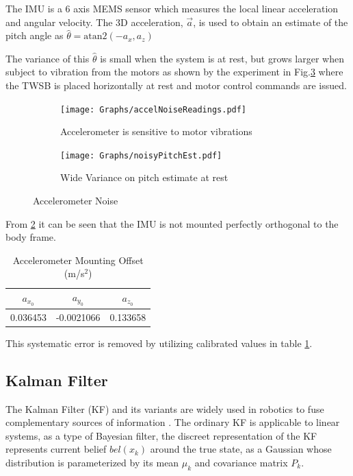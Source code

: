         The IMU is a 6 axis MEMS sensor \cite{ComplimentaryKalman} which measures the local linear acceleration 
        and angular velocity.
        The 3D acceleration, $\vec{a}$, is used to obtain an 
        estimate of the pitch angle as $\hat{\theta} = \mathrm{atan2}\left(-a_x ,a_z \right)$

        The variance of this $\hat{\theta}$ is small when the system is at rest, but grows larger when subject to vibration from the motors
        as shown by the experiment in Fig.\ref{fig:accelNoise} where the TWSB is placed horizontally at rest and motor control commands are issued. 
        \begin{figure}[H]
            \centering
            \begin{subfigure}[b]{0.5\textwidth}

                \texttt{[image: Graphs/accelNoiseReadings.pdf]}
                \caption{Accelerometer is sensitive to motor vibrations}
                \label{fig:accelRaw}
                
            \end{subfigure}
            \hfill
            \begin{subfigure}[b]{0.45\textwidth}
                \texttt{[image: Graphs/noisyPitchEst.pdf]}
                \caption{Wide Variance on pitch estimate at rest}
                \label{fig:pitchNoise}
            \end{subfigure}
            \caption{Accelerometer Noise}   
            \label{fig:accelNoise}
        \end{figure}

        From \ref{fig:pitchNoise} it can be seen that the IMU is not mounted perfectly orthogonal to the body frame. 
        \begin{table}[H]
            \centering
            \begin{tabular}{c c c} 
                \toprule
                $a_{x_0}$ & $a_{y_0}$ & $a_{z_0}$ \\
                \midrule
                0.036453 & -0.0021066 & 0.133658 \\
                \bottomrule

            \end{tabular}
            \caption{Accelerometer Mounting Offset (m/s$^{2}$)}
            \label{tab:accelOffset}
        \end{table}
        This systematic error is removed by utilizing calibrated values in table \ref{tab:accelOffset}.
        \subsection{Kalman Filter}
        The Kalman Filter (KF) and its variants  are widely used in robotics to fuse 
        complementary sources of information \cite{Thrun2005ProbabilisticRobotics} \cite{perez2023quadcopter} \cite{Moore2014AGE}.
        The ordinary KF is applicable to linear systems, as a type of Bayesian filter, 
        the discreet representation of the KF represents current belief $bel(x_k)$ around the true state,
        as a Gaussian whose distribution is parameterized by its mean $\mu_k$ and covariance matrix $P_k$.

